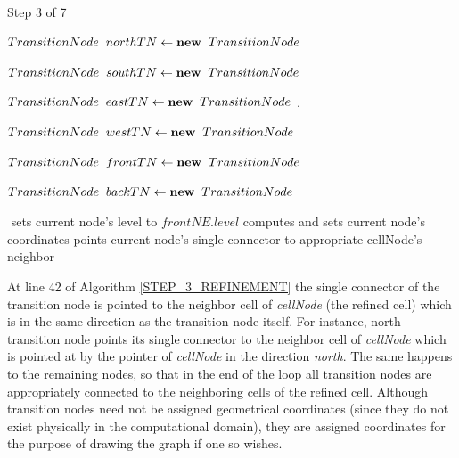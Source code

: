\begin{algorithm}[!hb]
    \caption{Step 3 of 7}
    \small{
    \begin{algorithmic}[1]
        \State $TransitionNode \hspace{2mm} northTN \gets \textbf{new} \hspace{2mm} TransitionNode$

        \State $TransitionNode \hspace{2mm} southTN \gets \textbf{new} \hspace{2mm} TransitionNode$

        \State $TransitionNode \hspace{2mm} eastTN \gets \textbf{new} \hspace{2mm} TransitionNode$
        .

        \State $TransitionNode \hspace{2mm} westTN \gets \textbf{new} \hspace{2mm} TransitionNode$

        \State $TransitionNode \hspace{2mm} frontTN \gets \textbf{new} \hspace{2mm} TransitionNode$

        \State $TransitionNode \hspace{2mm} backTN \gets \textbf{new} \hspace{2mm} TransitionNode$


        \State $ $
            \State sets current node's level to $frontNE.level$
            \State computes and sets current node's coordinates
            \State points current node's single connector to appropriate cellNode's neighbor
        \EndFor
    \end{algorithmic}
    }
    \label{STEP_3_REFINEMENT}
\end{algorithm}
At line 42 of Algorithm \ref{STEP_3_REFINEMENT} the single connector
of the transition node is pointed to the neighbor cell of
\textit{cellNode} (the refined cell) which is in the same direction
as the transition node itself. For instance, north transition node
points its single connector to the neighbor cell of
\textit{cellNode} which is pointed at by the pointer of
\textit{cellNode} in the direction \textit{north}. The same happens
to the remaining nodes, so that in the end of the loop all
transition nodes are appropriately connected to the neighboring
cells of the refined cell. Although transition nodes need not be
assigned geometrical coordinates (since they do not exist physically
in the computational domain), they are assigned coordinates for the
purpose of drawing the graph if one so wishes.


